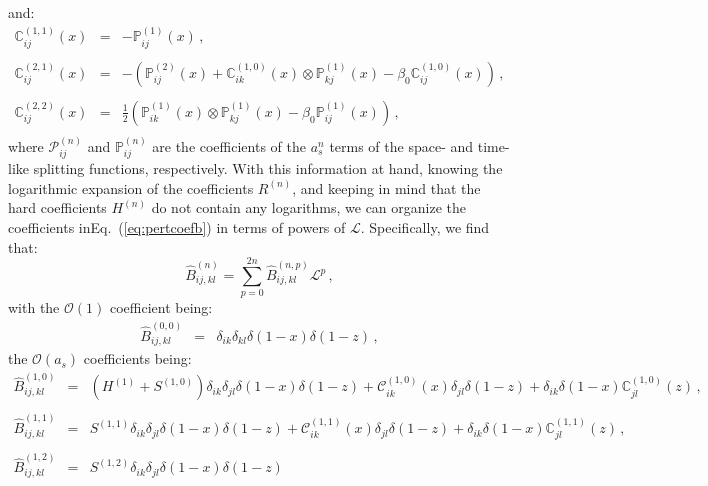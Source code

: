 \documentclass[10pt,a4paper]{article}
\begin{document}
and:
\begin{equation}
\begin{array}{rcl}
  \mathbb{C}_{ij}^{(1,1)}(x) &=& -\mathbb{P}_{ij}^{(1)}(x) \,,\\
  \\
  \mathbb{C}_{ij}^{(2,1)}(x) &=& -\left(\mathbb{P}_{ij}^{(2)}(x)+\mathbb{C}_{ik}^{(1,0)}(x)
                                  \otimes
                                  \mathbb{P}_{kj}^{(1)}(x)-\beta_0
                                  \mathbb{C}_{ij}^{(1,0)}(x) \right)\,,\\
  \\
  \mathbb{C}_{ij}^{(2,2)}(x) &=&\displaystyle
                                  \frac12\left(\mathbb{P}_{ik}^{(1)}(x)\otimes \mathbb{P}_{kj}^{(1)}(x)-\beta_0 \mathbb{P}_{ij}^{(1)}(x)\right)\,,\\
\end{array}
\end{equation}
where $\mathcal{P}_{ij}^{(n)}$ and $\mathbb{P}_{ij}^{(n)}$ are the
coefficients of the $a_s^n$ terms of the space- and time-like
splitting functions, respectively. With this information at hand,
knowing the logarithmic expansion of the coefficients $R^{(n)}$, and
keeping in mind that the hard coefficients $H^{(n)}$ do not contain
any logarithms, we can organize the coefficients
inEq.~(\ref{eq:pertcoefb}) in terms of powers of
$\mathcal{L}$. Specifically, we find that:
\begin{equation}
\hat{B}_{ij,kl}^{(n)} = \sum_{p=0}^{2n}\hat{B}_{ij,kl}^{(n,p)}\mathcal{L}^p\,,
\end{equation}
with the $\mathcal{O}(1)$ coefficient being:
\begin{equation}\label{eq:expLO}
\begin{array}{rcl}
  \hat{B}_{ij,kl}^{(0,0)} &=& \delta_{ik}\delta_{kl}\delta(1-x)
                              \delta(1-z)\,,
\end{array}
\end{equation}
the $\mathcal{O}(a_s)$ coefficients being:
\begin{equation}
\begin{array}{rcl}
  \hat{B}_{ij,kl}^{(1,0)} &=&\displaystyle
                              (H^{(1)}+S^{(1,0)})\delta_{ik}\delta_{jl}\delta(1-x)\delta(1-z)+ \mathcal{C}_{ik}^{(1,0)}(x)\delta_{jl}\delta(1-z) + \delta_{ik}\delta(1-x)\mathbb{C}_{jl}^{(1,0)}(z)\,,\\
  \\
  \hat{B}_{ij,kl}^{(1,1)} &=& S^{(1,1)}\delta_{ik}\delta_{jl}\delta(1-x)\delta(1-z)+ \mathcal{C}_{ik}^{(1,1)}(x)\delta_{jl}\delta(1-z) + \delta_{ik}\delta(1-x)\mathbb{C}_{jl}^{(1,1)}(z) \,,\\
  \\
  \hat{B}_{ij,kl}^{(1,2)} &=&
                              S^{(1,2)}\delta_{ik}\delta_{jl}\delta(1-x)\delta(1-z)
\end{array}
\end{equation}
\end{document}
